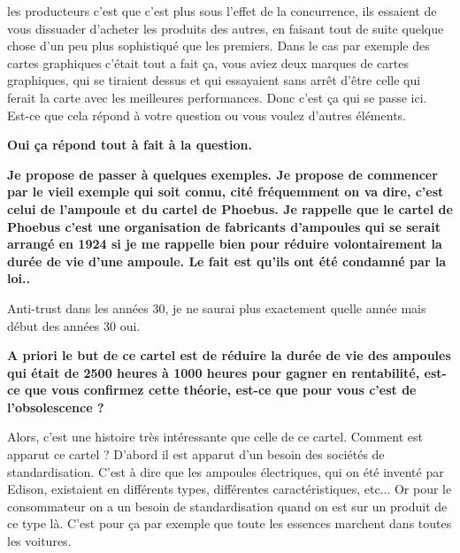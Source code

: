 \begin{small}
les producteurs c'est que c'est plus sous l'effet de la concurrence, ils essaient de vous dissuader d'acheter les produits des autres, en faisant tout de suite quelque chose d'un peu plus sophistiqué que les premiers. Dans le cas par exemple des cartes graphiques c'était tout a fait ça, vous aviez deux marques de cartes graphiques, qui se tiraient dessus et qui essayaient sans arrêt d'être celle qui ferait la carte avec les meilleures performances. Donc c'est ça qui se passe ici. Est-ce que cela répond à votre question ou vous voulez d'autres éléments.

\smallbreak\textbf{Oui ça répond tout à fait à la question.
}\smallbreak


\smallbreak\textbf{Je propose de passer à quelques exemples. Je propose de commencer par le vieil exemple qui soit connu, cité fréquemment on va dire, c'est celui de l'ampoule et du cartel de Phoebus. Je rappelle que le cartel de Phoebus c'est une organisation de fabricants d'ampoules qui se serait arrangé en 1924 si je me rappelle bien pour réduire volontairement la durée de vie d'une ampoule. Le fait est qu'ils ont été condamné par la loi..
}\smallbreak


Anti-trust dans les années 30, je ne saurai plus exactement quelle année mais début des années 30 oui. 


\smallbreak\textbf{A priori le but de ce cartel est de réduire la durée de vie des ampoules qui était de 2500 heures à 1000 heures pour gagner en rentabilité, est-ce que vous confirmez cette théorie, est-ce que pour vous c'est de l'obsolescence ?}\smallbreak

Alors, c'est une histoire très intéressante que celle de ce cartel. Comment est apparut ce cartel ? D'abord il est apparut d'un besoin des sociétés de standardisation. C'est à dire que les ampoules électriques, qui on été inventé par Edison, existaient en différents types, différentes caractéristiques, etc...
Or pour le consommateur on a un besoin de standardisation quand on est sur un produit de ce type là. C'est pour ça par exemple que toute les essences marchent dans toutes les voitures.


\end{small}
